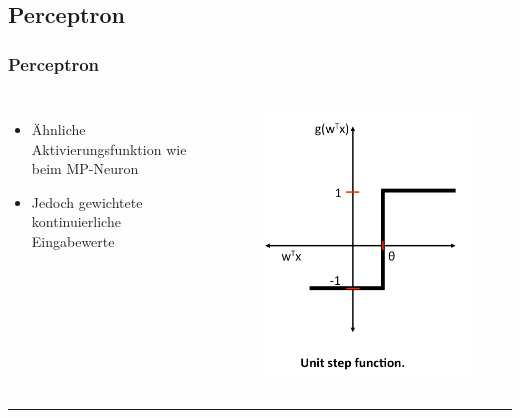 \subsection{Perceptron}

\begin{frame}
\frametitle{Perceptron}

\begin{columns}

\begin{itemize}
\item Ähnliche Aktivierungsfunktion wie beim MP-Neuron
\item Jedoch gewichtete kontinuierliche Eingabewerte
\end{itemize}


\begin{figure}
\includegraphics[width=.8\linewidth]{./geschichtliches/perceptron/img/perceptron_einheitsSprungfunktion_alpha}
\end{figure}

\end{columns}


\hspace{1mm}
\hrule


\begin{columns}


\end{columns}
\end{frame}
